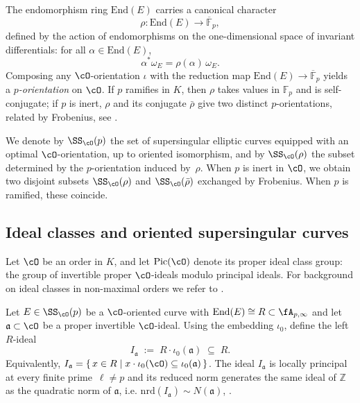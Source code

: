 \documentclass[10pt]{amsart}
\theoremstyle{theostyle}
\newcommand{\FF}{\mathbb{F}} \newcommand{\HH}{\mathbb{H}}
\newcommand{\ZZ}{\mathbb{Z}}
\renewcommand{\fa}{\mathfrak{a}} \newcommand{\fb}{\mathfrak{b}} \newcommand{\fc}{\mathfrak{c}}
\newcommand{\End}{\mathrm{End}}
\newcommand{\Pic}{\mathrm{Pic}}
\begin{document}
The endomorphism ring $\End(E)$ carries a canonical character
\[
\rho:\End(E)\longrightarrow \overline{\FF}_p,
\]
defined by the action of endomorphisms on the one-dimensional space of
invariant differentials: for all $\alpha\in\End(E)$,
\[
\alpha^* \omega_E = \rho(\alpha)\,\omega_E.
\]
Composing any $\cO$-orientation $\iota$ with the reduction map
$\End(E)\rightarrow\overline{\FF}_p$ yields a \emph{$p$-orientation} on $\cO$.
If $p$ ramifies in $K$, then $\rho$ takes values in $\FF_p$ and is
self-conjugate; if $p$ is inert, $\rho$ and its conjugate $\bar\rho$ give
two distinct $p$-orientations, related by Frobenius, see \cite{MOSIDH}.

We denote by $\SS_\cO(p)$ the set of supersingular elliptic curves equipped
with an optimal $\cO$-orientation, up to oriented isomorphism, and by
$\SS_\cO(\rho)$ the subset determined by the $p$-orientation induced by~$\rho$.
When $p$ is inert in $\cO$, we obtain two disjoint subsets
$\SS_\cO(\rho)$ and $\SS_\cO(\bar\rho)$ exchanged by Frobenius.  
When $p$ is ramified, these coincide.


\subsection{Ideal classes and oriented supersingular curves}

Let $\cO$ be an order in $K$, and let $\Pic(\cO)$ denote its proper
ideal class group: the group of invertible proper $\cO$-ideals modulo
principal ideals. For background on ideal classes in non-maximal orders we refer to \cite{Cox:Primes,Deuring,Kohel1996}.

Let $E\in\SS_\cO(p)$ be a $\cO$-oriented curve with $\End(E)\cong R\subset\fA_{p,\infty}$ and let $\fa\subset\cO$ be a proper invertible $\cO$-ideal.
Using the embedding $\iota_0$, define the left $R$-ideal
\begin{equation}\label{eq:Ia-definition}
	I_\fa \;:=\; R\cdot \iota_0(\fa)
	\;\subseteq\; R.
\end{equation}
Equivalently, $I_\fa = \{\,x\in R \mid x \cdot \iota_0(\cO) \subseteq \iota_0(\fa)\,\}$. 
The ideal $I_\fa$ is locally principal at
every finite prime~$\ell\ne p$ and its reduced norm generates the same ideal of $\ZZ$ as the quadratic norm of $\fa$, i.e. $\mathrm{nrd}(I_\fa)\sim N(\fa)$, \cite{Kohel1996}.
\end{document}
